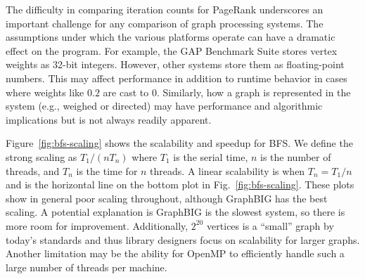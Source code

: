 \documentclass{llncs}
\begin{document}
The difficulty in comparing iteration counts for PageRank underscores an important challenge for any comparison of graph processing systems. The assumptions under which the various platforms operate can have a dramatic effect on the program. For example, the GAP Benchmark Suite stores vertex weights as 32-bit integers. However, other systems store them as floating-point numbers. This may affect performance in addition to runtime behavior in cases where weights like $0.2$ are cast to $0$. Similarly, how a graph is represented in the system (e.g., weighed or directed) may have performance and algorithmic implications but is not always readily apparent.

Figure~\ref{fig:bfs-scaling} shows the scalability and speedup for BFS. We define the strong scaling as $T_1 / (n T_n)$ where $T_1$ is the serial time, $n$ is the number of threads, and $T_n$ is the time for $n$ threads. A linear scalability is when $T_n = T_1/n$ and is the horizontal line on the bottom plot in Fig.~\ref{fig:bfs-scaling}. These plots show in general poor scaling throughout, although GraphBIG has the best scaling. A potential explanation is GraphBIG is the slowest system, so there is more room for improvement. Additionally, $2^{20}$ vertices is a ``small'' graph by today's standards and thus library designers focus on scalability for larger graphs. Another limitation may be the ability for OpenMP to efficiently handle such a large number of threads per machine.
\end{document}
